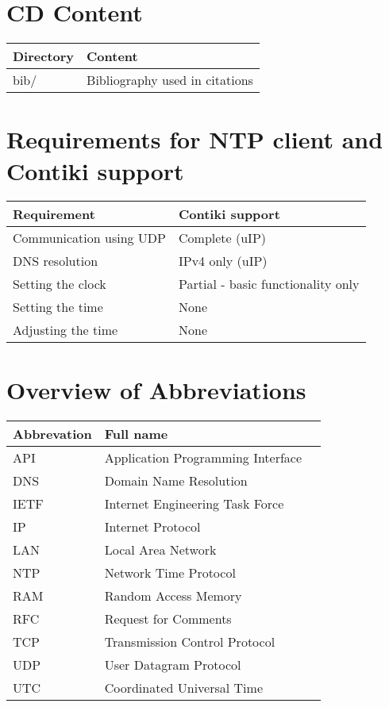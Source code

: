
\chapter{CD Content}
\begin{tabular}{|l|l|}
	\hline
	Directory & Content \\ \hline
	bib/ & Bibliography used in citations \\
	\hline
\end{tabular}

\chapter{Requirements for NTP client and Contiki support}
\begin{tabular}{|l|l|}
	\hline
	Requirement & Contiki support \\ \hline
	Communication using UDP & Complete (uIP) \\
	DNS resolution & IPv4 only (uIP) \\
	Setting the clock & Partial - basic functionality only \\
	Setting the time & None \\
	Adjusting the time & None \\
	\hline
\end{tabular}

\chapter{Overview of Abbreviations}
\begin{tabular}{|l|l|l|}
	\hline
	Abbrevation & Full name \\ \hline
	API & Application Programming Interface\\
	DNS & Domain Name Resolution \\
	IETF & Internet Engineering Task Force \\
	IP & Internet Protocol \\
	LAN & Local Area Network \\
	NTP & Network Time Protocol \\
	RAM & Random Access Memory \\
	RFC & Request for Comments \\
	TCP & Transmission Control Protocol \\
	UDP & User Datagram Protocol \\
	UTC & Coordinated Universal Time\\
	\hline
\end{tabular}
